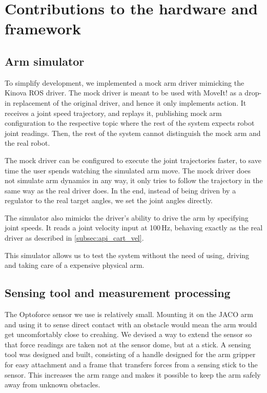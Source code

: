 \documentclass[buriama8_dp.tex]{subfiles}
\begin{document}
\section{Contributions to the hardware and framework}
\label{sec:hw_contrib}

\subsection{Arm simulator}
\label{subsec:arm_sim}

To simplify development, we implemented a mock arm driver mimicking the Kinova ROS driver. The mock driver is meant to be used with MoveIt! as a drop-in replacement of the original driver, and hence it only implements  action. It receives a joint speed trajectory, and replays it, publishing mock arm configuration to the respective topic where the rest of the system expects robot joint readings. Then, the rest of the system cannot distinguish the mock arm and the real robot.

The mock driver can be configured to execute the joint trajectories faster, to save time the user spends watching the simulated arm move. The mock driver does not simulate arm dynamics in any way, it only tries to follow the trajectory in the same way as the real driver does. In the end, instead of being driven by a regulator to the real target angles, we set the joint angles directly.

The simulator also mimicks the driver's ability to drive the arm by specifying joint speeds. It reads a joint velocity input at 100\,Hz, behaving exactly as the real driver as described in \ref{subsec:api_cart_vel}.

This simulator allows us to test the system without the need of using, driving and taking care of a expensive physical arm.


\subsection{Sensing tool and measurement processing}
\label{subsec:sense_tool}

The Optoforce sensor we use is relatively small. Mounting it on the JACO arm and using it to sense direct contact with an obstacle would mean the arm would get uncomfortably close to creahing. We devised a way to extend the sensor so that force readings are taken not at the sensor dome, but at a stick. A sensing tool was designed and built, consisting of a handle designed for the arm gripper for easy attachment and a frame that transfers forces from a sensing stick to the sensor. This increases the arm range and makes it possible to keep the arm safely away from unknown obstacles.
\end{document}
